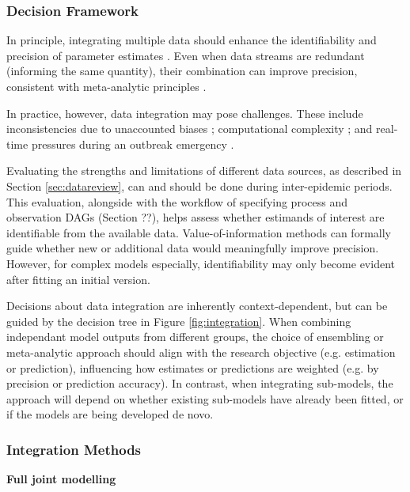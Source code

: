 \documentclass{article}
\begin{document}
\subsubsection{Decision Framework}

In principle, integrating multiple data should enhance the identifiability and precision of parameter estimates \citep{deangelis2018analysing, lison2024generative, russell2024combined}. Even when data streams are redundant (informing the same quantity), their combination can improve precision, consistent with meta-analytic principles \citep{deangelis2018analysing}. 

In practice, however, data integration may pose challenges. These include inconsistencies due to unaccounted biases \citep{knock2021key, corbella2022inferring, Ward2024-sp}; computational complexity \citep{corbella2022inferring}; and real-time pressures during an outbreak emergency \citep{mccaw2023role}.

Evaluating the strengths and limitations of different data sources, as described in Section \ref{sec:datareview}, can and should be done during inter-epidemic periods. This evaluation, alongside with the workflow of specifying process and observation DAGs (Section ??), helps assess whether estimands of interest are identifiable from the available data. Value-of-information methods \citep{jackson2019value} can formally guide whether new or additional data would meaningfully improve precision. However, for complex models especially, identifiability may only become evident after fitting an initial version.

Decisions about data integration are inherently context-dependent, but can be guided by the decision tree in Figure \ref{fig:integration}. When combining independant model outputs from different groups, the choice of ensembling or meta-analytic approach should align with the research objective (e.g. estimation or prediction), influencing how estimates or predictions are weighted (e.g. by precision or prediction accuracy). In contrast, when integrating sub-models, the approach will depend on whether existing sub-models have already been fitted, or if the models are being developed de novo.

\subsubsection{Integration Methods}

\textbf{Full joint modelling }
\end{document}
